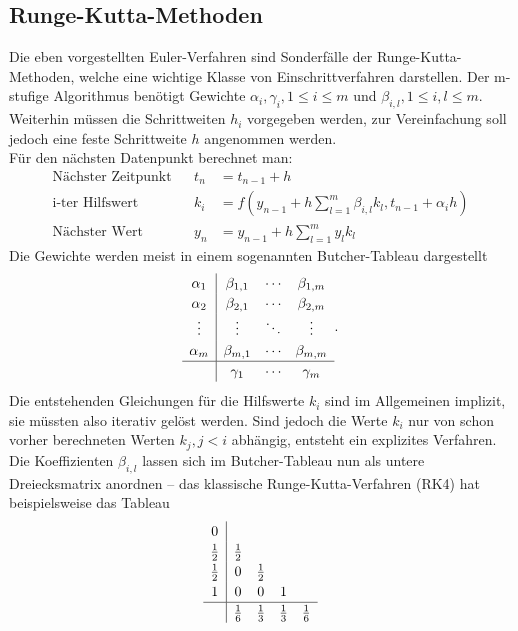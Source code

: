 \documentclass{scrartcl}
\begin{document}
\subsection{Runge-Kutta-Methoden}
Die eben vorgestellten Euler-Verfahren sind Sonderfälle der Runge-Kutta-Methoden, welche eine wichtige Klasse von Einschrittverfahren darstellen. Der m-stufige Algorithmus benötigt Gewichte $\alpha_i, \gamma_i, 1 \le i \le m$ und $\beta_{i,l}, 1\le i, l\le m$. Weiterhin müssen die Schrittweiten  $h_i$ vorgegeben werden, zur Vereinfachung soll jedoch eine feste Schrittweite $h$ angenommen werden.\\
Für den nächsten Datenpunkt berechnet man:
\begin{equation}
\begin{aligned}
	\text{Nächster Zeitpunkt} && t_n &= t_{n-1} + h \\
	\text{i-ter Hilfswert} && k_i &= f\left(y_{n-1} + h \sum_{l=1}^m \beta_{i,l}k_l, t_{n-1} + \alpha_i h\right) \\
	\text{Nächster Wert} && y_n &= y_{n-1} + h\sum_{l=1}^m y_l k_l
\end{aligned}
\end{equation}
Die Gewichte werden meist in einem sogenannten Butcher-Tableau dargestellt
\begin{equation*}
	\begin{array}{c|ccc}
	\alpha_1 	& \beta_{1,1}   & \cdots & \beta_{1,m} \\
	\alpha_2 	& \beta_{2,1}   & \cdots & \beta_{2,m} \\
	\vdots      & \vdots        & \ddots & \vdots        \\
	\alpha_m    & \beta_{m,1}   & \cdots & \beta_{m,m} \\
	\hline
	            & \gamma_1      & \cdots & \gamma_m
\end{array}.
\end{equation*}
Die entstehenden Gleichungen für die Hilfswerte $k_i$ sind im Allgemeinen implizit, sie müssten also iterativ gelöst werden. Sind jedoch die Werte $k_i$ nur von schon vorher berechneten Werten $k_j, j < i$ abhängig, entsteht ein explizites Verfahren. Die Koeffizienten $\beta_{i,l}$ lassen sich im Butcher-Tableau nun als untere Dreiecksmatrix anordnen -- das klassische Runge-Kutta-Verfahren (RK4) hat beispielsweise das Tableau
\begin{equation}
\renewcommand\arraystretch{1.2}
\begin{array}{c|cccc}
	0 &&&& \\
	\tfrac{1}{2} & \tfrac{1}{2} &&& \\
	\tfrac{1}{2} & 0 & \tfrac{1}{2} && \\
	1 & 0 & 0 & 1 &\\
	\hline
	& \tfrac{1}{6} & \tfrac{1}{3} & \tfrac{1}{3} & \tfrac{1}{6}
\end{array}
\end{equation}
\end{document}
